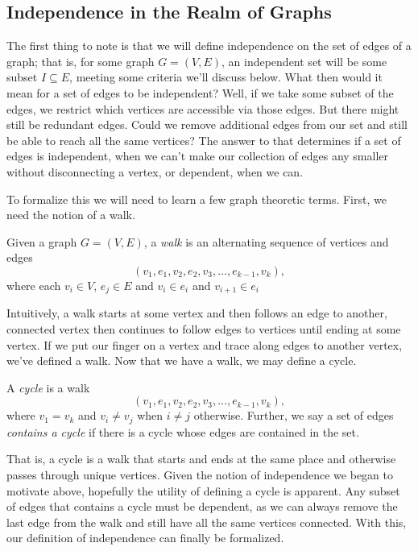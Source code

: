 \documentclass[12pt,oneside]{../../sfsuthesis}
\begin{document}
\subsection{Independence in the Realm of Graphs}

The first thing to note is that we will define independence on the set of edges of a graph;
that is, for some graph \( G = (V, E) \), an independent set will be some subset \( I \subseteq E \), meeting some criteria we'll discuss below.
What then would it mean for a set of edges to be independent?
Well, if we take some subset of the edges, we restrict which vertices are accessible via those edges.
But there might still be redundant edges.
Could we remove additional edges from our set and still be able to reach all the same vertices?
The answer to that determines if a set of edges is independent, when we can't make our collection of edges any smaller without disconnecting a vertex, or dependent, when we can.

To formalize this we will need to learn a few graph theoretic terms.
First, we need the notion of a walk.
\begin{definition}[Walk]
    Given a graph \( G = (V, E) \), a \emph{walk} is an alternating sequence of vertices and edges
    \[
        (v_1, e_1, v_2, e_2, v_3, \ldots, e_{k-1}, v_k),
    \]
    where each \( v_i \in V \), \( e_j \in E \) and \( v_i \in e_i \) and \( v_{i+1} \in e_i \)
\end{definition}
Intuitively, a walk starts at some vertex and then follows an edge to another, connected vertex then continues to follow edges to vertices until ending at some vertex.
If we put our finger on a vertex and trace along edges to another vertex, we've defined a walk.
Now that we have a walk, we may define a cycle.
\begin{definition}[Cycle]
    A \emph{cycle} is a walk
    \[
        (v_1, e_1, v_2, e_2, v_3, \ldots, e_{k-1}, v_k),
    \]
    where \( v_1 = v_k \) and \( v_i \neq v_j \) when \( i \neq j \) otherwise.
    Further, we say a set of edges \emph{contains a cycle} if there is a cycle whose edges are contained in the set.
\end{definition}
That is, a cycle is a walk that starts and ends at the same place and otherwise passes through unique vertices.
Given the notion of independence we began to motivate above, hopefully the utility of defining a cycle is apparent.
Any subset of edges that contains a cycle must be dependent, as we can always remove the last edge from the walk and still have all the same vertices connected.
With this, our definition of independence can finally be formalized.
\end{document}
